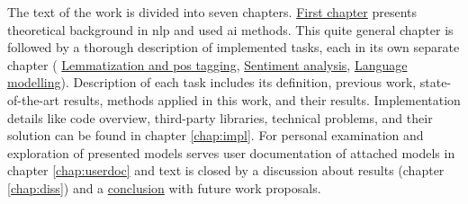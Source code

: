\par
The text of the work is divided into seven chapters. \hyperref[chap:theandme]{First chapter} presents theoretical background in \acrshort{nlp} and used \acrfull{ai} methods. This quite general chapter is followed by a thorough description of implemented tasks, each in its own separate chapter ( \hyperref[chap:tag]{Lemmatization and \acrlong{pos} tagging},  \hyperref[chap:sent]{Sentiment analysis},  \hyperref[chap:mod]{Language modelling}). Description of each task includes its definition, previous work, state-of-the-art results, methods applied in this work, and their results. Implementation details like code overview, third-party libraries, technical problems, and their solution can be found in chapter \ref{chap:impl}.
For personal examination and exploration of presented models serves user documentation of attached models in chapter \ref{chap:userdoc} and text is closed by a discussion about results (chapter \ref{chap:diss}) and a \hyperref[chap:concl]{conclusion} with future work proposals.

